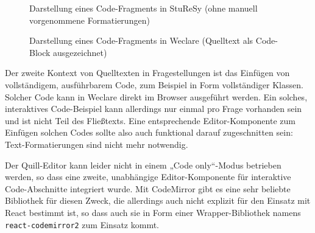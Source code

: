 \begin{figure}[H]
    \centering
    \setlength{\fboxsep}{0pt}
    \setlength{\fboxrule}{0.5pt}
    \caption{Darstellung eines Code-Fragments in StuReSy (ohne manuell vorgenommene  Formatierungen)}
    \label{abb:sturesy_code_fragment}
\end{figure}


\begin{figure}[H]
    \centering
    \setlength{\fboxsep}{0pt}
    \setlength{\fboxrule}{0.5pt}
    \caption{Darstellung eines Code-Fragments in Weclare (Quelltext als Code-Block ausgezeichnet)}
    \label{abb:weclare_code_fragment}
\end{figure}

Der zweite Kontext von Quelltexten in Fragestellungen ist das Einfügen von vollständigem, ausführbarem Code, zum Beispiel in Form vollständiger Klassen. Solcher Code kann in Weclare direkt im Browser ausgeführt werden. Ein solches, interaktives Code-Beispiel kann allerdings nur einmal pro Frage vorhanden sein und ist nicht Teil des Fließtexts. Eine entsprechende Editor-Komponente zum Einfügen solchen Codes sollte also auch funktional darauf zugeschnitten sein: Text-Formatierungen sind nicht mehr notwendig.

Der Quill-Editor kann leider nicht in einem „Code only“-Modus betrieben werden, so dass eine zweite, unabhängige Editor-Komponente für interaktive Code-Abschnitte integriert wurde. Mit CodeMirror gibt es eine sehr beliebte Bibliothek für diesen Zweck, die allerdings auch nicht explizit für den Einsatz mit React bestimmt ist, so dass auch sie in Form einer Wrapper-Bibliothek namens \texttt{react-codemirror2} zum Einsatz kommt.

